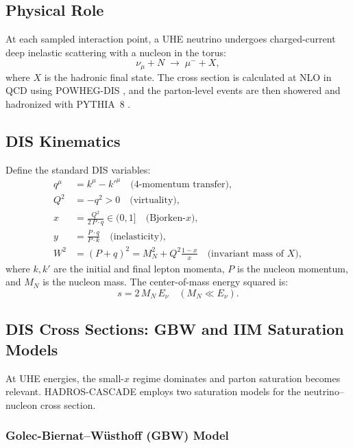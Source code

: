 \documentclass[11pt,a4paper]{article}
\begin{document}
\subsection{Physical Role}

At each sampled interaction point, a UHE neutrino undergoes charged-current deep inelastic scattering with a nucleon in the torus:
\begin{equation}
  \nu_\mu + N \;\longrightarrow\; \mu^- + X,
  \label{eq:dis}
\end{equation}
where $X$ is the hadronic final state. The cross section is calculated at NLO in QCD using POWHEG-DIS \cite{Alioli2010, POWHEG_DIS}, and the parton-level events are then showered and hadronized with PYTHIA~8 \cite{Sjostrand2014}.

\subsection{DIS Kinematics}

Define the standard DIS variables:
\begin{align}
  q^\mu &= k^\mu - k'^\mu \quad \text{(4-momentum transfer)},\\
  Q^2   &= -q^2 > 0 \quad \text{(virtuality)},\\
  x     &= \frac{Q^2}{2\,P\cdot q} \in (0,1] \quad \text{(Bjorken-}x\text{)},\\
  y     &= \frac{P\cdot q}{P\cdot k} \quad \text{(inelasticity)},\\
  W^2   &= (P + q)^2 = M_N^2 + Q^2\frac{1-x}{x} \quad \text{(invariant mass of }X\text{)},
\end{align}
where $k, k'$ are the initial and final lepton momenta, $P$ is the nucleon momentum, and $M_N$ is the nucleon mass. The center-of-mass energy squared is:
\begin{equation}
  s = 2\,M_N\,E_\nu \quad (M_N \ll E_\nu).
\end{equation}

\subsection{DIS Cross Sections: GBW and IIM Saturation Models}

At UHE energies, the small-$x$ regime dominates and parton saturation becomes relevant. HADROS-CASCADE employs two saturation models for the neutrino--nucleon cross section.

\subsubsection{Golec-Biernat--W\"{u}sthoff (GBW) Model}
\end{document}
